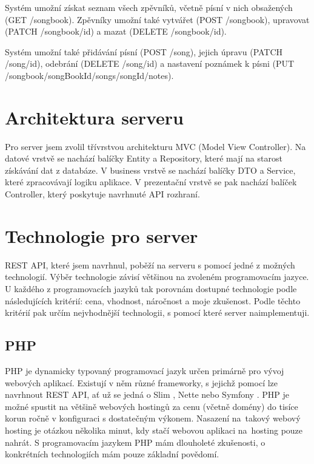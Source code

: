 Systém umožní získat seznam všech zpěvníků, včetně písní v nich obsažených (GET /songbook). Zpěvníky umožní také vytvářet (POST /songbook), upravovat (PATCH /songbook/id) a mazat (DELETE /songbook/id).

Systém umožní také přidávání písní (POST /song), jejich úpravu (PATCH /song/id), odebrá\-ní (DELETE /song/id) a nastavení poznámek k písni (PUT /songbook/songBookId/songs/song\allowbreak{}Id/notes).

\section{Architektura serveru}

Pro server jsem zvolil třívrstvou architekturu MVC (Model View Controller). Na datové vrstvě se nachází balíčky Entity a Repository, které mají na starost získávání dat z databáze. V business vrstvě se nachází balíčky DTO a Service, které zpracovávají logiku aplikace. V prezentační vrstvě se pak nachází balíček Controller, který poskytuje navrhnuté API rozhraní.

\section{Technologie pro server}

REST API, které jsem navrhnul, poběží na serveru s pomocí jedné z možných technologií. Výběr technologie závisí většinou na zvoleném programovacím jazyce. U každého z programovacích jazyků tak porovnám dostupné technologie podle následujících kritérií: cena, vhodnost, náročnost a moje zkušenost. Podle těchto kritérií pak určím nejvhodnější technologii, s pomocí které server naimplementuji.

\subsection{PHP}
\label{symfony}

PHP \cite{php} je dynamicky typovaný programovací jazyk určen primárně pro vývoj webových aplikací. Existují v něm různé frameworky, s jejichž pomocí lze navrhnout REST API, ať už se jedná o Slim \cite{slim}, Nette \cite{nette} nebo Symfony \cite{symfony}. PHP je možné spustit na většině webových hostingů za cenu (včetně domény) do tisíce korun ročně v konfiguraci s dostatečným výkonem. Nasazení na~takový webový hosting je otázkou několika minut, kdy stačí webovou aplikaci na~hosting pouze nahrát. S programovacím jazykem PHP mám dlouholeté zkušenosti, o konkrétních technologiích mám pouze základní povědomí.

